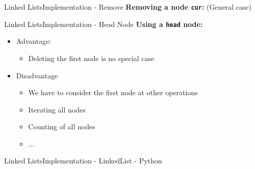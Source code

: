 
\begin{frame}[fragile]{Linked Lists}{Implementation - Remove}
  \textbf{Removing a node \texttt{cur}:} (General case)
  
\end{frame}


\begin{frame}{Linked Lists}{Implementation - Head Node}
  \textbf{Using a \texttt{head} node:}
  \begin{itemize}
  \item<2->Advantage:
    \begin{itemize}
    \item<3->
      Deleting the first node is no special case
    \end{itemize}
  \item<4->Disadvantage
    \begin{itemize}
    \item<4->
      We have to consider the first node at other operations
    \item<5->
      Iterating all nodes
    \item<5->
      Counting of all nodes
    \item<6->
      $\dots$
    \end{itemize}
  \end{itemize}
  \begin{flushleft}
    
  \end{flushleft}
\end{frame}


\begin{frame}[fragile]{Linked Lists}{Implementation - LinkedList - Python}
  
\end{frame}


